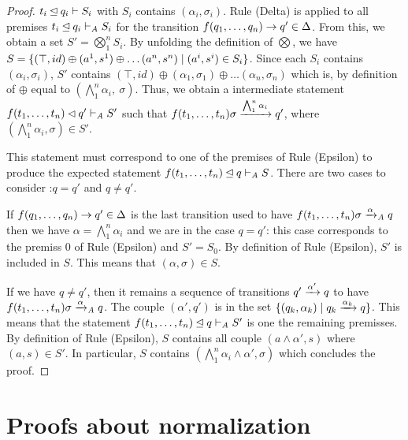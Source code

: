 \begin{proof}
  $t_i \unlhd q_i \vdash S_i$ with $S_i$ contains $(\alpha_i, \sigma_i)$.
  Rule (Delta) is applied to all premises $t_i \unlhd q_i \vdash_\mathit A S_i$ for the transition $f(q_1,\dots,q_n) \rightarrow q' \in \Delta$.  From
  this, we obtain a set $S' = \bigotimes^n_1 S_i$.  By unfolding the definition of $\bigotimes$, we have $S = \{(\top, id) \oplus (a^1,
  s^1) \oplus \dots (a^n, s^n) \; | \; (a^i, s^i) \in S_i \}$. Since each $S_i$ contains $(\alpha_i, \sigma_i)$, $S'$ contains $(\top, id)
  \oplus (\alpha_1, \sigma_1) \oplus \dots (\alpha_n, \sigma_n)$ which is, by definition of $\oplus$ equal to $(\bigwedge_1^n \alpha_i,\ \sigma)$.
  Thus, we obtain a intermediate statement $f(t_1, \dots, t_n) \lhd q' \vdash_\mathit A S'$ such that $f(t_1, \dots, t_n)\sigma \xrightarrow{\bigwedge_1^n \alpha_i} q'$,
  where $(\bigwedge_1^n \alpha_i, \sigma) \in S'$.

  This statement must correspond to one of the premises of Rule (Epsilon) to produce the expected statement $f(t_1,\dots, t_n) \unlhd q \vdash_\mathit A S$.
  There are two cases to consider :$q=q'$ and $q \not = q'$.

  If $f(q_1,\dots,q_n) \rightarrow q' \in \Delta$ is the last transition used to have $f(t_1, \dots, t_n)\sigma \xrightarrow{\alpha}_\mathit A q$ then
  we have $\alpha = \bigwedge_1^n \alpha_i$ and we are in the case $q = q'$: this case corresponds to the premiss $0$ of
  Rule (Epsilon) and $S' = S_0$. By definition of Rule (Epsilon), $S'$ is included in $S$. This means that $(\alpha, \sigma) \in S$.

  If we have $q \not= q'$, then it remains a sequence of transitions $q' \xrightarrow{\alpha'} q$ to have $f(t_1, \dots, t_n)\sigma \xrightarrow{\alpha}_\mathit A q$.
  The couple $(\alpha', q')$ is in the set $\{ (q_k, \alpha_k) \; | \; q_k \xrightarrow{\alpha_k} q\}$.%
  This means that the statement $f(t_1,\dots, t_n) \unlhd q \vdash_\mathit A S'$ is one the remaining premisses. %
  By definition of Rule (Epsilon), $S$ contains all couple $(a \land \alpha', s)$ where $(a, s) \in S'$. 
  In particular, $S$ contains $(\bigwedge_1^n \alpha_i \land \alpha', \sigma)$ which concludes the proof.
\end{proof}

\section{Proofs about normalization}

